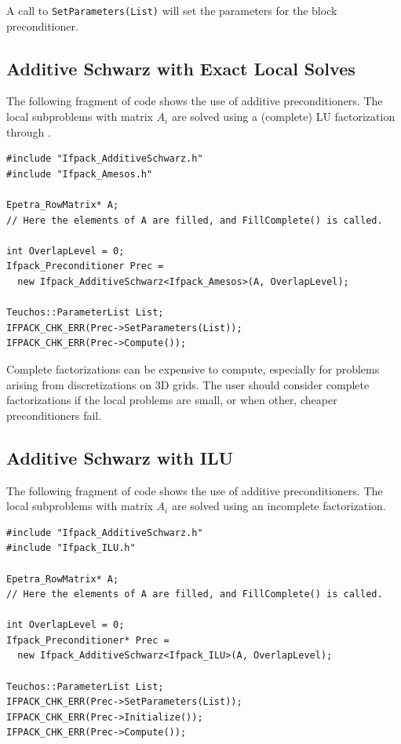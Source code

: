 A call to \verb!SetParameters(List)! will set the parameters for the block
preconditioner.

\subsection{Additive Schwarz with Exact Local Solves}
\label{sec:as_amesos}

The following fragment of code shows the use of additive preconditioners. The
local subproblems with matrix $A_i$ are solved using a (complete) LU
factorization through \amesos.
\begin{verbatim}
#include "Ifpack_AdditiveSchwarz.h"
#include "Ifpack_Amesos.h"

Epetra_RowMatrix* A;
// Here the elements of A are filled, and FillComplete() is called.

int OverlapLevel = 0;
Ifpack_Preconditioner Prec = 
  new Ifpack_AdditiveSchwarz<Ifpack_Amesos>(A, OverlapLevel);

Teuchos::ParameterList List;
IFPACK_CHK_ERR(Prec->SetParameters(List));
IFPACK_CHK_ERR(Prec->Compute());
\end{verbatim}

\begin{remark}
Complete factorizations can be expensive to compute, especially for problems
arising from discretizations on 3D grids. The user should consider complete
factorizations if the local problems are small, or when other, cheaper
preconditioners fail.
\end{remark}

\subsection{Additive Schwarz with ILU}
\label{sec:as_ilu}

The following fragment of code shows the use of additive preconditioners. The
local subproblems with matrix $A_i$ are solved using an incomplete
factorization.
\begin{verbatim}
#include "Ifpack_AdditiveSchwarz.h"
#include "Ifpack_ILU.h"

Epetra_RowMatrix* A;
// Here the elements of A are filled, and FillComplete() is called.

int OverlapLevel = 0;
Ifpack_Preconditioner* Prec = 
  new Ifpack_AdditiveSchwarz<Ifpack_ILU>(A, OverlapLevel);

Teuchos::ParameterList List;
IFPACK_CHK_ERR(Prec->SetParameters(List));
IFPACK_CHK_ERR(Prec->Initialize());
IFPACK_CHK_ERR(Prec->Compute());
\end{verbatim}

